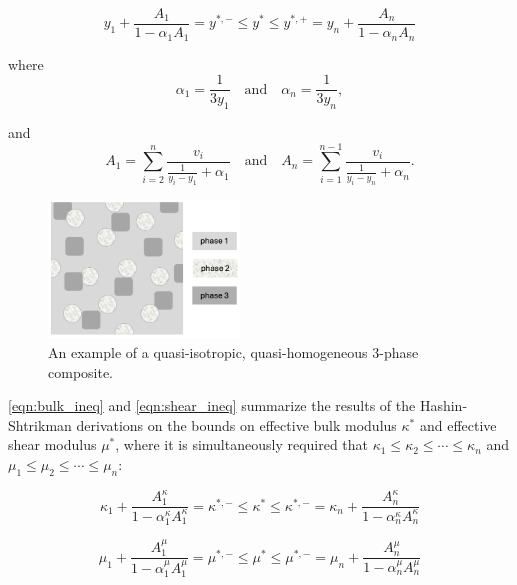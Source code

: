 \begin{equation}\label{eqn:gen_ineq}
y_{1} + \frac{A_{1}}{1 - \alpha_{1}A_{1}}
= y^{*,-} \leq y^{*} \leq y^{*,+} = 
y_{n} + \frac{A_{n}}{1 - \alpha_{n}A_{n}}
\end{equation}

where \begin{equation}\label{eqn:gen_alphas}
\alpha_{1} = \frac{1}{3y_{1}}
\quad \text{and} \quad
\alpha_{n} = \frac{1}{3y_{n}},
\end{equation}

and \begin{equation}\label{eqn:gen_As}
A_{1} = \sum\limits_{i=2}^{n} \frac{v_{i}}{\frac{1}{y_{i} - y_{1}} + \alpha_{1}}
\quad \text{and} \quad
A_{n} = \sum\limits_{i=1}^{n-1} \frac{v_{i}}{\frac{1}{y_{i} - y_{n}} + \alpha_{n}}.
\end{equation}

\begin{figure}
\centering
\includegraphics[width=2in,height=\textheight,keepaspectratio]{figures/3phase_composite.png}
\caption{An example of a quasi-isotropic, quasi-homogeneous 3-phase
composite. \label{fig:cartoon-3phase}}
\end{figure}

\autoref{eqn:bulk_ineq} and \autoref{eqn:shear_ineq} summarize the
results of the Hashin-Shtrikman derivations on the bounds on effective
bulk modulus \(\kappa^{*}\) and effective shear modulus \(\mu^{*}\),
where it is simultaneously required that
\(\kappa_{1} \leq \kappa_{2} \leq \dotsb \leq \kappa_{n}\) and
\(\mu_{1} \leq \mu_{2} \leq \dotsb \leq \mu_{n}\):

\begin{equation}\label{eqn:bulk_ineq}
\kappa_{1} + \frac{A_{1}^{\kappa}}{1 - \alpha_{1}^{\kappa}A_{1}^{\kappa}}
= \kappa^{*,-} \leq \kappa^{*} \leq \kappa^{*,-} = 
\kappa_{n} + \frac{A_{n}^{\kappa}}{1 - \alpha_{n}^{\kappa}A_{n}^{\kappa}}
\end{equation}

\begin{equation}\label{eqn:shear_ineq}
\mu_{1} + \frac{A_{1}^{\mu}}{1 - \alpha_{1}^{\mu}A_{1}^{\mu}}
= \mu^{*,-} \leq \mu^{*} \leq \mu^{*,-} = 
\mu_{n} + \frac{A_{n}^{\mu}}{1 - \alpha_{n}^{\mu}A_{n}^{\mu}}
\end{equation}

